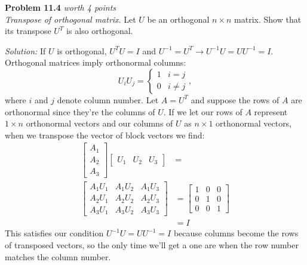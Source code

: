 \documentclass{article}
\newenvironment{problem}[3][Problem]
    { \begin{mdframed}[backgroundcolor=gray!20] \textbf{#1 #2} \textit{worth #3 points} \\}
    {  \end{mdframed}}
\newenvironment{solution}
    {\textit{Solution:}}
    {}
\begin{document}
\begin{problem}{11.4}{4}
\textit{Transpose of orthogonal matrix}. Let $U$ be an orthogonal $n\times n$ matrix. Show that its transpose $U^T$ is also orthogonal.
\end{problem}
\begin{solution}
If $U$ is orthogonal, $U^TU = I$ and $U^{-1} = U^T\longrightarrow U^{-1}U=UU^{-1}=I$.\\
Orthogonal matrices imply orthonormal columns: $$U_iU_j=\left\{\begin{array}{cc}
    1 & i = j \\
    0 & i \neq j 
\end{array},\right. $$ where $i$ and $j$ denote column number. Let $A = U^{T}$ and suppose the rows of $A$ are orthonormal since they're the columns of $U$. If we let our rows of $A$ represent $1\times n$ orthonormal vectors and our columns of $U$ as $n\times 1$ orthonormal vectors, when we transpose the vector of block vectors we find:
\begin{align*}
    \begin{bmatrix} A_1 \\ A_2 \\ A_3 \end{bmatrix} \begin{bmatrix} U_1 & U_2 & U_3 \end{bmatrix} &=\\
    \begin{bmatrix} A_1U_1 &  A_1U_2 & A_1U_3\\ A_2U_1 & A_2U_2 & A_2U_3 \\ A_3U_1 & A_3U_2 & A_3U_3 \end{bmatrix} &= \begin{bmatrix} 1 &  0 & 0\\ 0 & 1 & 0 \\ 0 & 0 & 1 \end{bmatrix}\\
    &= I
\end{align*}
This satisfies our condition $U^{-1}U=UU^{-1}=I$ because columns become the rows of transposed vectors, so the only time we'll get a one are when the row number matches the column number.

\end{solution}
\newpage
\end{document}
